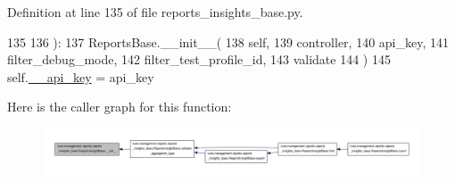 Definition at line 135 of file reports\-\_\-insights\-\_\-base.\-py.


\begin{DoxyCode}
135 
136     ):
137         ReportsBase.\_\_init\_\_(
138             self,
139             controller,
140             api\_key,
141             filter\_debug\_mode,
142             filter\_test\_profile\_id,
143             validate
144         )
145         self.\hyperlink{classtune_1_1management_1_1reports_1_1reports__insights__base_1_1ReportsInsightBase_a0d22e330edc50e64ff0a26b6f6f6154a}{\_\_api\_key} = api\_key

\end{DoxyCode}


Here is the caller graph for this function\-:
\nopagebreak
\begin{figure}[H]
\begin{center}
\leavevmode
\includegraphics[width=350pt]{classtune_1_1management_1_1reports_1_1reports__insights__base_1_1ReportsInsightBase_a92ce64372ea1665fb6826883a2739f3d_icgraph}
\end{center}
\end{figure}




